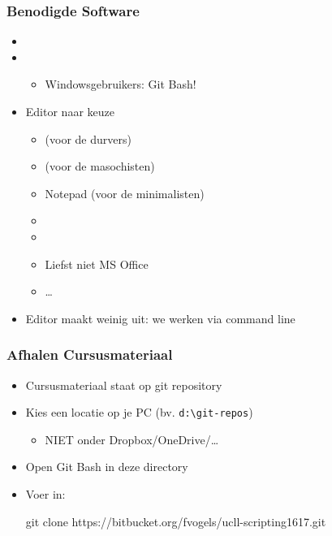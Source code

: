 \begin{frame}
  \frametitle{Benodigde Software}
  \begin{itemize}
    \item {}
    \item {}
          \begin{itemize}
            \item Windowsgebruikers: Git Bash!
          \end{itemize}
    \item Editor naar keuze
          \begin{itemize}
            \item {} (voor de durvers)
            \item {} (voor de masochisten)
            \item Notepad (voor de minimalisten)
            \item {}
            \item {}
            \item Liefst niet MS Office
            \item \dots
          \end{itemize}
    \item Editor maakt weinig uit: we werken via command line
  \end{itemize}
\end{frame}

\begin{frame}
  \frametitle{Afhalen Cursusmateriaal}
  \begin{itemize}
    \item Cursusmateriaal staat op git repository
    \item Kies een locatie op je PC (bv. \texttt{d:\textbackslash git-repos})
          \begin{itemize}
            \item NIET onder Dropbox/OneDrive/\dots
          \end{itemize}
    \item Open Git Bash in deze directory
    \item Voer in:
          \begin{center} \ttfamily\scriptsize
            git clone https://bitbucket.org/fvogels/ucll-scripting1617.git
          \end{center}
  \end{itemize}
\end{frame}



